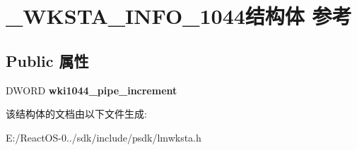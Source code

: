 \hypertarget{struct___w_k_s_t_a___i_n_f_o__1044}{}\section{\+\_\+\+W\+K\+S\+T\+A\+\_\+\+I\+N\+F\+O\+\_\+1044结构体 参考}
\label{struct___w_k_s_t_a___i_n_f_o__1044}
\subsection*{Public 属性}
\begin{DoxyCompactItemize}
\item 
\mbox{\label{struct___w_k_s_t_a___i_n_f_o__1044_a0f6f9943f8f2be2b17e77e41a4fc768e}} 
D\+W\+O\+RD {\bfseries wki1044\+\_\+pipe\+\_\+increment}
\end{DoxyCompactItemize}


该结构体的文档由以下文件生成\+:\begin{DoxyCompactItemize}
\item 
E\+:/\+React\+O\+S-\/0../sdk/include/psdk/lmwksta.\+h\end{DoxyCompactItemize}
